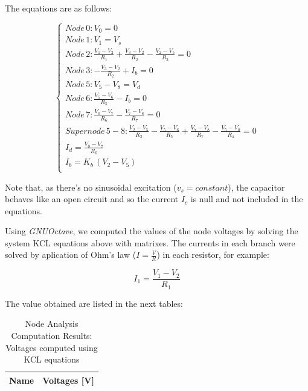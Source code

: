 The equations are as follows:

\begin{equation} 
\begin{cases}

    Node\, 0: V_0 = 0 \\
    Node\, 1: V_1 = V_s \\
    Node\, 2: \frac{V_1 - V_2}{R_1} + \frac{V_3 - V_2}{R_2} - \frac{V_2 - V_5}{R_3} = 0 \\
    Node\, 3: -\frac{V_3 - V_2}{R_2} + I_b = 0 \\
    Node\, 5: V_5 - V_8 = V_d \\
    Node\, 6: \frac{V_5 - V_6}{R_5} - I_b = 0 \\
    Node\, 7: \frac{V_0 - V_7}{R_6} - \frac{V_7 - V_8}{R_7} = 0 \\
    Supernode\, 5-8: \frac{V_2 - V_5}{R_3} - \frac{V_5 - V_6}{R_5} + \frac{V_7 - V_8}{R_7} - \frac{V_5 - V_0}{R_4} = 0 \\
    I_d = \frac{V_0 - V_7}{R_6} \\
    I_b = K_b\,(V_2 - V_5) \\
    
\end{cases}
\label{eq:1}
\end{equation}


Note that, as there's no sinusoidal excitation ($v_s = constant$), the capacitor behaves like an open circuit and so the current $I_c$ is null and not included in the equations.


Using \textit{GNUOctave}, we computed the values of the node voltages by solving the system KCL equations above with matrixes. The currents in each branch were solved by aplication of Ohm's law ($I = \frac{V}{R}$) in each resistor, for example:

\begin{center}
  \begin{equation}
    I_1 = \frac{V_1 - V_2}{R_1}
  \end{equation} 
\end{center}


The value obtained are listed in the next tables:


\begin{table}[h]
  \centering
  \begin{tabular}{|l|r|}
    \hline    
    {\bf Name} & {\bf Voltages [V]} \\ \hline
    
  \end{tabular}
  \caption{Node Analysis Computation Results: Voltages computed using KCL equations}
  \label{tab:nodeVoltages1}
\end{table}


